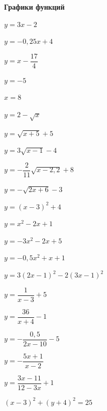 \centerline{\bf \Huge Графики функций}

 $y=3x-2$

 $y=-0,25x+4$

 $y=x-\dfrac{17}{4}$

 $y=-5$

 $x=8$

 $y=2-\sqrt{x}$

 $y=\sqrt{x+5}+5$

 $y=3\sqrt{x-1}-4$

 $y=-\dfrac{2}{11}\sqrt{x-2,2}+8$

 $y=-\sqrt{2x+6}-3$

 $y=(x-3)^2+4$

 $y=x^2-2x+1$

 $y=-3x^2-2x+5$

 $y=-0,5x^2+x+1$

 $y=3(2x-1)^2-2(3x-1)^2$

 $y=\dfrac{1}{x-3}+5$

 $y=\dfrac{36}{x+4}-1$

 $y=-\dfrac{0,5}{2x-10}-5$

 $y=-\dfrac{5x+1}{x-2}$

 $y=\dfrac{3x-11}{12-3x}+1$

 $(x-3)^2+(y+4)^2=25$